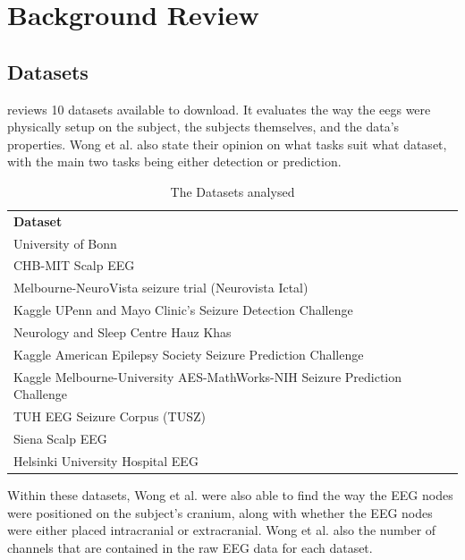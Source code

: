 \documentclass[12pt]{article}
\begin{document}
\section{Background Review}

\subsection{Datasets}\label{datasets}

\cite{wong2023eeg} reviews 10 datasets available to download. It evaluates the way the \acrshort{eegs} were physically setup on the subject, the subjects themselves, and the data's properties. Wong et al. also state their opinion on what tasks suit what dataset, with the main two tasks being either detection or prediction. 

\begin{table}[H]
\centering
\begin{tabular}{l}
\textbf{Dataset}                       \\
University of Bonn                   \\
CHB-MIT Scalp EEG                    \\
Melbourne-NeuroVista seizure trial (Neurovista Ictal)                           \\
Kaggle UPenn and Mayo Clinic's Seizure Detection Challenge                     \\
Neurology and Sleep Centre Hauz Khas \\
Kaggle American Epilepsy Society Seizure Prediction Challenge                  \\
Kaggle Melbourne-University AES-MathWorks-NIH Seizure Prediction Challenge \\
TUH EEG Seizure Corpus (TUSZ)        \\
Siena Scalp EEG                      \\
Helsinki University Hospital EEG    
\end{tabular}
\caption{The Datasets analysed}
\end{table}

Within these datasets, Wong et al. were also able to find the way the EEG nodes were positioned on the subject's cranium, along with whether the EEG nodes were either placed intracranial or extracranial. Wong et al. also the number of channels that are contained in the raw EEG data for each dataset.
\end{document}
